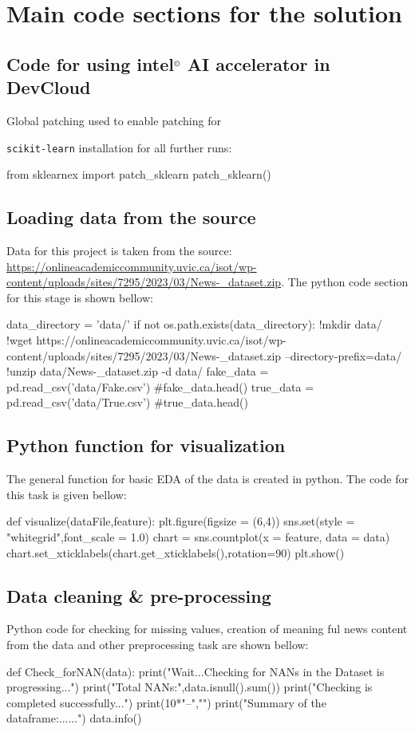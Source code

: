 \documentclass{josis}
\begin{document}
{\section{Main code sections for the solution}
\subsection{Code for using intel$^\copyright$ AI accelerator in DevCloud}
 Global patching used to enable patching for {\texttt{scikit-learn} installation for all further runs:
\begin{python}
from sklearnex import patch_sklearn
patch_sklearn()
\end{python}
\subsection{Loading data from the source}
Data for this project is taken from the source: \url{https://onlineacademiccommunity.uvic.ca/isot/wp-content/uploads/sites/7295/2023/03/News-_dataset.zip}. The python code section for this stage is shown bellow:
\begin{python}
data_directory = 'data/'
if not os.path.exists(data_directory):
    !mkdir data/
    !wget https://onlineacademiccommunity.uvic.ca/isot/wp-content/uploads/sites/7295/2023/03/News-_dataset.zip --directory-prefix=data/
    !unzip data/News-_dataset.zip -d data/
    fake_data = pd.read_csv('data/Fake.csv')
#fake_data.head()
true_data = pd.read_csv('data/True.csv')
#true_data.head()
\end{python}
\subsection{Python function for visualization}
The general function for basic EDA of the data is created in python. The code for this task is given bellow:
\begin{python}
def visualize(dataFile,feature):
       plt.figure(figsize = (6,4))
       sns.set(style = "whitegrid",font_scale = 1.0)
       chart = sns.countplot(x = feature, data = data)
       chart.set_xticklabels(chart.get_xticklabels(),rotation=90)
       plt.show()
\end{python}
\subsection{Data cleaning \& pre-processing}
Python code for checking for missing values, creation of meaning ful news content from the data and other preprocessing task are shown bellow:
\begin{python}
def Check_forNAN(data):
    print("Wait...Checking for NANs in the Dataset is progressing...")
    print("Total NANs:",data.isnull().sum())
    print("Checking is completed successfully...\n")
    print(10*"--","\n")
    print("Summary of the dataframe:......\n")
    data.info()


\end{python}}}
\end{document}
